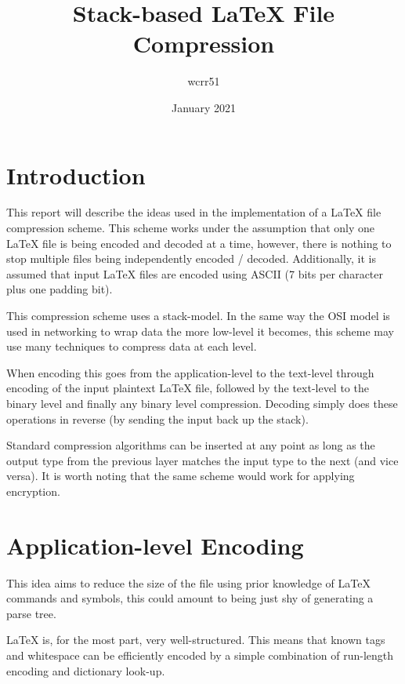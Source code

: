\documentclass[11pt]{article}
\title{Stack-based \LaTeX{} File Compression}
\author{wcrr51}
\date{January 2021}
\begin{document}
    \maketitle

    \begin{multicols*}{2}

        \section{Introduction}\label{sec:introduction}
        This report will describe the ideas used in the implementation of a \LaTeX{} file compression scheme.
        This scheme works under the assumption that only one \LaTeX{} file is being encoded and decoded at a time, however, there is nothing to stop multiple files being independently encoded / decoded.
        Additionally, it is assumed that input \LaTeX{} files are encoded using ASCII (7 bits per character plus one padding bit).

        This compression scheme uses a stack-model.
        In the same way the OSI model is used in networking to wrap data the more low-level it becomes, this scheme may use many techniques to compress data at each level.

        When encoding this goes from the application-level to the text-level through encoding of the input plaintext \LaTeX{} file, followed by the text-level to the binary level and finally any binary level compression.
        Decoding simply does these operations in reverse (by sending the input back up the stack).

        Standard compression algorithms can be inserted at any point as long as the output type from the previous layer matches the input type to the next (and vice versa).
        It is worth noting that the same scheme would work for applying encryption.


        \section{Application-level Encoding}\label{sec:application-level-encoding}
        This idea aims to reduce the size of the file using prior knowledge of \LaTeX{} commands and symbols, this could amount to being just shy of generating a parse tree.

        \LaTeX{} is, for the most part, very well-structured.
        This means that known tags and whitespace can be efficiently encoded by a simple combination of run-length encoding and dictionary look-up.



\end{multicols*}
\end{document}

